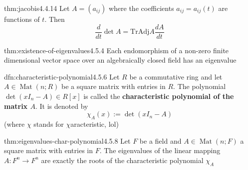 \documentclass[landscape, 8pt]{extarticle}
\DeclareMathOperator{\Mat}{Mat}
\begin{document}
\begin{multicols}{3}
\begin{thm}{thm:jacobis}{4.4.14}
    Let $A = (a_{ij})$ where the coefficients $a_{ij} = a_{ij}(t)$ are functions of $t$. Then
    \[\frac{d}{dt} \det A = \text{Tr}\text{Adj} A \frac{dA}{dt}\]
\end{thm}


\begin{thm}{thm:existence-of-eigenvalues}{4.5.4}
    Each endomorphism of a non-zero finite dimensional vector space over an algebraically closed field has an eigenvalue
\end{thm}

\begin{dfn}{dfn:characteristic-polynomial}{4.5.6}
    Let $R$ be a commutative ring and let $A\in \Mat(n;R)$ be a square matrix with entries in $R$. The polynomial $\det(x I_{n} - A)\in R[x]$ is called the \textbf{characteristic polynomial of the matrix $A$}. It is denoted by
    \[\chi_{A}(x) := \det(x I_{n} - A)\]
    (where $\chi$ stands for $\chi$aracteristic, lol)
\end{dfn}

\begin{thm}{thm:eigenvalues-char-polynomial}{4.5.8}
    Let $F$ be a field and $A\in \Mat(n;F)$ a square matrix with entries in $F$. The eigenvalues of the linear mapping $A : F^{n}\to F^{n}$ are exactly the roots of the characteristic polynomial $\chi_{A}$
\end{thm}


\end{multicols}
\end{document}
